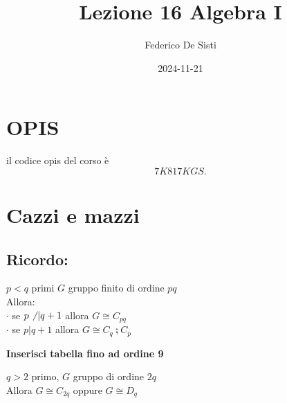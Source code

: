 \documentclass[12px]{article}
\title{Lezione 16 Algebra I}
\date{2024-11-21}
\author{Federico De Sisti}
\begin{document}
	\maketitle
	\newpage
	\section{OPIS}
	il codice opis del corso è 
	\[
	7K817KGS
	.\] 
	\section{Cazzi e mazzi}
	\subsection{Ricordo:}
	\begin{teo}
		$p < q$ primi $G$ gruppo finito di ordine $pq$\\
		Allora:\\
		$\cdot$ se $p\not \ | q + 1$ allora $G\cong C_{pq}$\\
		 $\cdot$ se $p | q + 1$ allora $ G\cong C_q\semi C_p$
	\end{teo}
	\textbf{Inserisci tabella fino ad ordine 9}
	\begin{coro}
		$q > 2$ primo, $G$ gruppo di ordine $2q$\\
		Allora $G\cong C_{2q}$ oppure $G\cong D_q$
	\end{coro}
\end{document}
